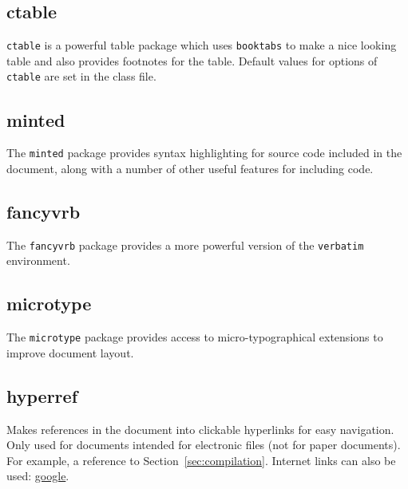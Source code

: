 \documentclass[electronic,timesopt]{adharticle} %
\begin{document}
\subsection{ctable}

\texttt{ctable} is a powerful table package which uses \texttt{booktabs} to make
a nice looking table and also provides footnotes for the table. Default values
for options of \texttt{ctable} are set in the class file.

\subsection{minted}

The \texttt{minted} package provides syntax highlighting for source code
included in the document, along with a number of other useful features for
including code.

\subsection{fancyvrb}

The \texttt{fancyvrb} package provides a more powerful version of the
\texttt{verbatim} environment.

\subsection{microtype}

The \texttt{microtype} package provides access to micro-typographical extensions
to improve document layout.

\subsection{hyperref}

Makes references in the document into clickable hyperlinks for easy
navigation. Only used for documents intended for electronic files (not for paper
documents). For example, a reference to Section~\ref{sec:compilation}. Internet
links can also be used: \href{http://www.google.co.uk}{google}.
\end{document}
